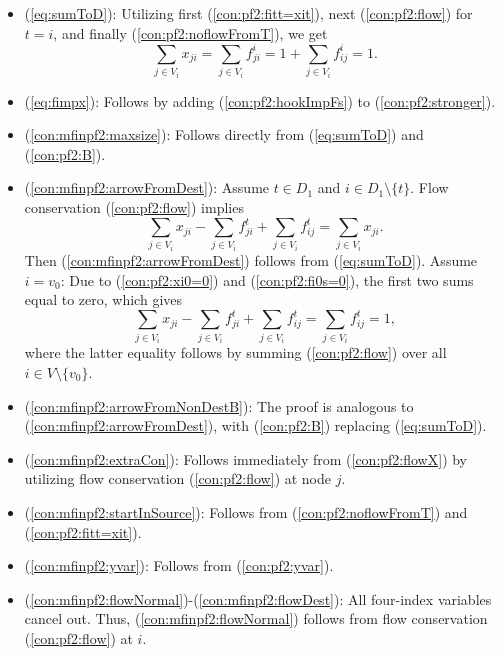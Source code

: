 \begin{itemize}

\item[](\ref{eq:sumToD}): Utilizing first (\ref{con:pf2:fitt=xit}), next (\ref{con:pf2:flow}) for $t=i$, and finally (\ref{con:pf2:noflowFromT}), we get
$$\sum_{j\in V_i}x_{ji}=\sum_{j\in V_i}f_{ji}^i = 1+\sum_{j\in V_i}f_{ij}^i=1.$$

\item[] (\ref{eq:fimpx}): Follows by adding (\ref{con:pf2:hookImpFs}) to (\ref{con:pf2:stronger}).

\item[] (\ref{con:mfinpf2:maxsize}): Follows directly from (\ref{eq:sumToD}) and (\ref{con:pf2:B}).

\item[] (\ref{con:mfinpf2:arrowFromDest}): Assume $t\in D_1$ and $i\in D_1\setminus\{t\}$. Flow conservation (\ref{con:pf2:flow}) implies
$$\sum_{j\in V_i}x_{ji} - \sum_{j\in V_i}f_{ji}^t + \sum_{j\in V_i}f_{ij}^t = \sum_{j\in V_i}x_{ji}.$$ Then (\ref{con:mfinpf2:arrowFromDest}) follows from (\ref{eq:sumToD}).
Assume $i=v_0$: Due to (\ref{con:pf2:xi0=0}) and (\ref{con:pf2:fi0s=0}), the first two sums equal to zero, which gives
$$\sum_{j\in V_i}x_{ji} - \sum_{j\in V_i}f_{ji}^t + \sum_{j\in V_i}f_{ij}^t = \sum_{j\in V_i}f_{ij}^t = 1,$$
where the latter equality follows by summing (\ref{con:pf2:flow}) over all $i\in V\setminus\{v_0\}$.

\item[] (\ref{con:mfinpf2:arrowFromNonDestB}): The proof is analogous to (\ref{con:mfinpf2:arrowFromDest}), with (\ref{con:pf2:B}) replacing (\ref{eq:sumToD}).

\item[] (\ref{con:mfinpf2:extraCon}): Follows immediately from (\ref{con:pf2:flowX}) by utilizing flow conservation (\ref{con:pf2:flow}) at node $j$.

\item[] (\ref{con:mfinpf2:startInSource}): Follows from (\ref{con:pf2:noflowFromT}) and (\ref{con:pf2:fitt=xit}).

\item[] (\ref{con:mfinpf2:yvar}): Follows from (\ref{con:pf2:yvar}).

\item[] (\ref{con:mfinpf2:flowNormal})-(\ref{con:mfinpf2:flowDest}): All four-index variables cancel out. Thus, (\ref{con:mfinpf2:flowNormal}) follows from flow conservation (\ref{con:pf2:flow}) at $i$.


\end{itemize}
